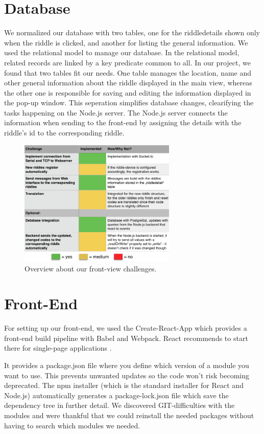 \section{Database}
We normalized our database with two tables, one for the riddledetails shown only when the riddle is clicked, and another for listing the general information.
We used the relational model to manage our database. 
In the relational model, related records are linked by a key predicate common to all. 
In our project, we found that two tables fit our needs. 
One table manages the location, name and other general information about the riddle displayed in the main view, 
whereas the other one is responsible for saving and editing the information displayed in the pop-up window. 
This seperation simplifies database changes, clearifying the tasks happening on the Node.js server.
The Node.js server connects the information when sending to the front-end by assigning the details with the riddle's id to the corresponding riddle. 


\begin{figure}[th]
	\centering
	\includegraphics[width=75mm,scale=0.75]{Figures/backendOverview}
	\decoRule
	\caption[FrontViewTable]{Overview about our front-view challenges.}
	\label{fig:FrontViewTable}
\end{figure}

\section{Front-End}
For setting up our front-end, we used the Create-React-App which provides a front-end build pipeline with Babel and Webpack.
React recommends to start there for single-page applications \parencite{createReactApp}. 

It provides a package.json file where you define which version of a module you want to use. This prevents unwanted updates so the code won't risk becoming deprecated.
The npm installer (which is the standard installer for React and Node.js) automatically generates a package-lock.json file which save the dependency tree in further detail.
We discovered GIT-difficulties with the modules and were thankful that we could reinstall the needed packages without having to search which modules we needed.

